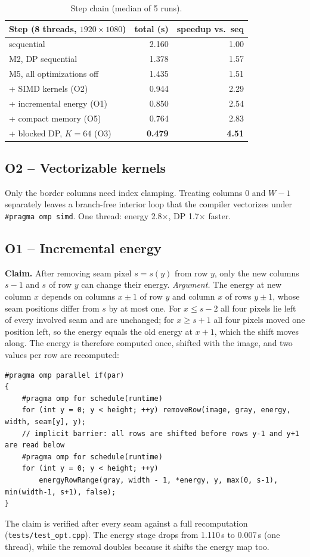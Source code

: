 \documentclass[11pt,a4paper]{article}
\newcommand{\x}{\ensuremath{\times}}
\begin{document}
\begin{table}[ht]
\centering\small
\begin{tabular}{@{}lrr@{}}
\toprule
Step (8 threads, $1920\times1080$) & total (s) & speedup vs.\ seq \\
\midrule
sequential & 2.160 & 1.00 \\
M2, DP sequential & 1.378 & 1.57 \\
M5, all optimizations off & 1.435 & 1.51 \\
+ SIMD kernels (O2) & 0.944 & 2.29 \\
+ incremental energy (O1) & 0.850 & 2.54 \\
+ compact memory (O5) & 0.764 & 2.83 \\
+ blocked DP, $K=64$ (O3) & \textbf{0.479} & \textbf{4.51} \\
\bottomrule
\end{tabular}
\caption{Step chain (median of 5 runs).}
\label{tab:chain}
\end{table}

\subsection{O2 -- Vectorizable kernels}
Only the border columns need index clamping. Treating columns 0 and $W-1$ separately leaves a branch-free
interior loop that the compiler vectorizes under \texttt{\#pragma omp simd}. One thread: energy 2.8\x, DP
1.7\x{} faster.

\subsection{O1 -- Incremental energy}
\textbf{Claim.} After removing seam pixel $s=s(y)$ from row $y$, only the new columns $s-1$ and $s$ of row
$y$ can change their energy. \emph{Argument.} The energy at new column $x$ depends on columns $x\pm1$ of row
$y$ and column $x$ of rows $y\pm1$, whose seam positions differ from $s$ by at most one. For $x\le s-2$ all
four pixels lie left of every involved seam and are unchanged; for $x\ge s+1$ all four pixels moved one
position left, so the energy equals the old energy at $x+1$, which the shift moves along. The energy is
therefore computed once, shifted with the image, and two values per row are recomputed:
\begin{lstlisting}[style=cpp]
#pragma omp parallel if(par)
{
    #pragma omp for schedule(runtime)
    for (int y = 0; y < height; ++y) removeRow(image, gray, energy, width, seam[y], y);
    // implicit barrier: all rows are shifted before rows y-1 and y+1 are read below
    #pragma omp for schedule(runtime)
    for (int y = 0; y < height; ++y)
        energyRowRange(gray, width - 1, *energy, y, max(0, s-1), min(width-1, s+1), false);
}
\end{lstlisting}
The claim is verified after every seam against a full recomputation (\texttt{tests/test\_opt.cpp}). The
energy stage drops from 1.110\,s to 0.007\,s (one thread), while the removal doubles because it shifts the
energy map too.
\end{document}
